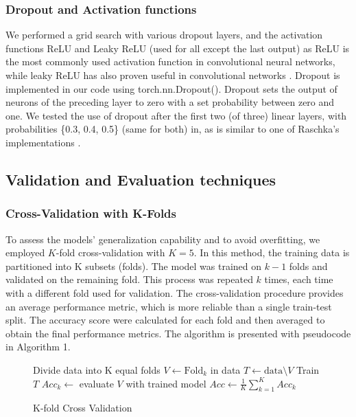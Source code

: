 \subsubsection{Dropout and Activation functions}
We performed a grid search with various dropout layers, and the activation functions ReLU and Leaky ReLU (used for all except the last output) as ReLU is the most commonly used activation function in convolutional neural networks, while leaky ReLU has also proven useful in convolutional networks \cite {activation_functions}. Dropout is implemented in our code using torch.nn.Dropout(). Dropout sets the output of neurons of the preceding layer to zero with a set probability between zero and one. We tested the use of dropout after the first two (of three) linear layers, with probabilities \{0.3, 0.4, 0.5\} (same for both) in, as is similar to one of Raschka's implementations \cite[p. 478]{raschka2022machine}.


\subsection{Validation and Evaluation techniques}

\subsubsection{Cross-Validation with K-Folds}

To assess the models' generalization capability and to avoid overfitting, we employed $K$-fold cross-validation with $K = 5$. In this method, the training data is partitioned into K subsets (folds). The model was trained on $k-1$ folds and validated on the remaining fold. This process was repeated $k$ times, each time with a different fold used for validation. The cross-validation procedure provides an average performance metric, which is more reliable than a single train-test split. The accuracy score were calculated for each fold and then averaged to obtain the final performance metrics. The algorithm is presented with pseudocode in Algorithm 1.


\begin{figure}[H]
    \begin{algorithm}[H]
    \caption{K-fold Cross Validation \cite{K-foldCrossValidation}}
    \label{algo:kfold}
        \begin{algorithmic}[1]
            \State Divide data into K equal folds 
                \State $V \gets \text{Fold}_{k}$ in data
                \State $T \gets \text{data} \setminus V$
                \State Train $T$
                \State $Acc_k \gets$ evaluate $V$ with trained model
            \EndFor
            \State $Acc \gets \frac{1}{K} \sum_{k=1}^{K} Acc_k$
             \EndProcedure
        \end{algorithmic}
    \end{algorithm}
\end{figure}

